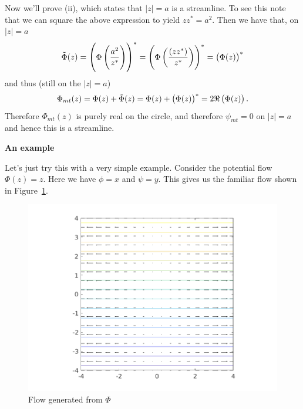 \documentclass{article}
\def\ti#1{\tilde{#1}}
\begin{document}
Now we'll prove (ii), which states that $|z| = a$ is a streamline. To
see this note that we can square the above expression to yield $z z^* =
a^2$. Then we have that, on $|z| = a$
%
\begin{equation*}
    \ti\Phi(z)
        = \del{\Phi \del{\frac{a^2}{z^*}}}^*
        = \del{\Phi \del{\frac{(z z^*)}{z^*}}}^*
        = \del{\Phi(z)}^*
\end{equation*}
%
and thus (still on the $|z| = a$)
%
\begin{equation*}
    \Phi_{mt}(z) = \Phi(z) + \ti\Phi(z) = \Phi(z) + \del{\Phi(z)}^* = 2 \Re\del{\Phi(z)}
    .
\end{equation*}
%
Therefore $\Phi_{mt}(z)$ is purely real on the circle, and therefore
$\psi_{mt} = 0$ on $|z| = a$ and hence this is a streamline.

\textbf{An example}

Let's just try this with a very simple example. Consider the potential
flow $\Phi(z) = z$. Here we have $\phi = x$ and $\psi = y$. This gives
us the familiar flow shown in Figure~\ref{fig:mt-1}.
%
\begin{figure}[!ht]
    \includegraphics[width=35em]{as09fig2}
    \centering
    \caption{Flow generated from $\Phi$}
    \label{fig:mt-1}
\end{figure}
\end{document}
